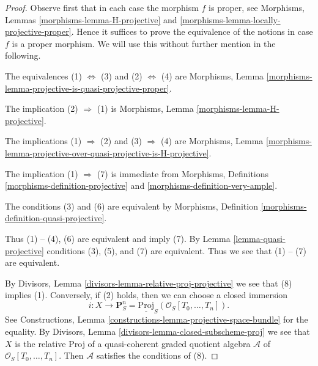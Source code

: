 \begin{proof}
Observe first that in each case the morphism $f$ is proper, see
Morphisms, Lemmas \ref{morphisms-lemma-H-projective} and
\ref{morphisms-lemma-locally-projective-proper}.
Hence it suffices to prove the equivalence of the notions in
case $f$ is a proper morphism. We will use this without further
mention in the following.

\medskip\noindent
The equivalences (1) $\Leftrightarrow$ (3) and
(2) $\Leftrightarrow$ (4) are
Morphisms, Lemma \ref{morphisms-lemma-projective-is-quasi-projective-proper}.

\medskip\noindent
The implication (2) $\Rightarrow$ (1) is
Morphisms, Lemma \ref{morphisms-lemma-H-projective}.

\medskip\noindent
The implications (1) $\Rightarrow$ (2) and (3) $\Rightarrow$ (4) are
Morphisms, Lemma
\ref{morphisms-lemma-projective-over-quasi-projective-is-H-projective}.

\medskip\noindent
The implication (1) $\Rightarrow$ (7) is immediate from
Morphisms, Definitions \ref{morphisms-definition-projective} and
\ref{morphisms-definition-very-ample}.

\medskip\noindent
The conditions (3) and (6) are equivalent by
Morphisms, Definition \ref{morphisms-definition-quasi-projective}.

\medskip\noindent
Thus (1) -- (4), (6) are equivalent and imply (7). By
Lemma \ref{lemma-quasi-projective}
conditions (3), (5), and (7) are equivalent.
Thus we see that (1) -- (7) are equivalent.

\medskip\noindent
By Divisors, Lemma \ref{divisors-lemma-relative-proj-projective}
we see that (8) implies (1). Conversely, if (2) holds, then
we can choose a closed immersion
$$
i :
X
\longrightarrow
\mathbf{P}^n_S = \underline{\text{Proj}}_S(\mathcal{O}_S[T_0, \ldots, T_n]).
$$
See Constructions, Lemma \ref{constructions-lemma-projective-space-bundle}
for the equality. By
Divisors, Lemma \ref{divisors-lemma-closed-subscheme-proj}
we see that $X$ is the relative Proj of a quasi-coherent graded quotient
algebra $\mathcal{A}$ of $\mathcal{O}_S[T_0, \ldots, T_n]$.
Then $\mathcal{A}$ satisfies the conditions of (8).
\end{proof}

